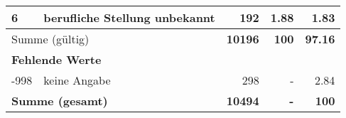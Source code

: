 \begin{longtable}{lXrrr}
     6 &
     \multicolumn{1}{X}{ berufliche Stellung unbekannt   } &


       \num{192} &
       \num[round-mode=places,round-precision=2]{1.88} &
         \num[round-mode=places,round-precision=2]{1.83} \\
     \midrule
     \multicolumn{2}{l}{Summe (gültig)} &
       \textbf{\num{10196}} &
     \textbf{\num{100}} &
       \textbf{\num[round-mode=places,round-precision=2]{97.16}} \\
     \multicolumn{5}{l}{\textbf{Fehlende Werte}}\\
       -998 &
       keine Angabe &
         \num{298} &
        - &
         \num[round-mode=places,round-precision=2]{2.84} \\
     \midrule
     \multicolumn{2}{l}{\textbf{Summe (gesamt)}} &
          \textbf{\num{10494}} &
        \textbf{-} &
        \textbf{\num{100}} \\
     \bottomrule
     \end{longtable}
     
